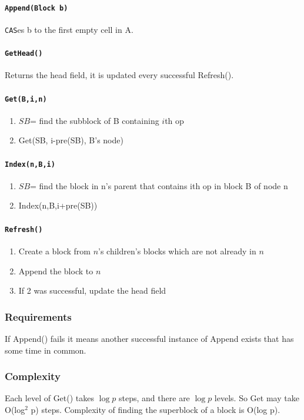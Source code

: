 \documentclass[12pt]{article}
\begin{document}
\paragraph{\texttt{Append(Block b)}} \texttt{CAS}es b to the first empty cell in A.
\paragraph{\texttt{GetHead()}} Returns the head field, it is updated every successful Refresh().
\paragraph{\texttt{Get(B,i,n)}}
\begin{enumerate}
  \item $SB$= find the subblock of B containing $i$th op
  \item Get(SB, i-pre(SB), B's node)
\end{enumerate}
\paragraph{\texttt{Index(n,B,i)}}
\begin{enumerate}
  \item $SB$= find the block in n's parent that contains ith op in block B of node n
  \item Index(n,B,i+pre(SB))
\end{enumerate}
\paragraph{\texttt{Refresh()}}
\begin{enumerate}
  \item Create a block from $n$'s children's blocks which are not already in $n$
  \item Append the block to $n$
  \item If 2 was successful, update the head field
\end{enumerate}
\subsubsection{Requirements} If Append() fails it means another successful instance of Append exists that has some time in common.
\subsubsection{Complexity} Each level of Get() takes $\log p$ steps, and there are $\log p$ levels. So Get may take O(log$^2$ p) steps. Complexity of finding the superblock of a block is O(log p).
\end{document}
